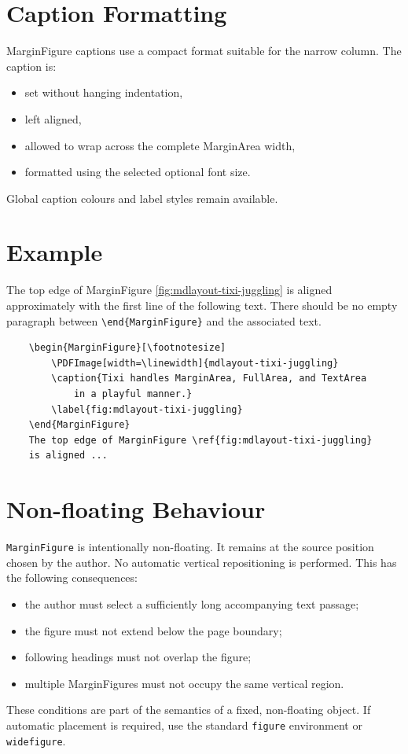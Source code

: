 \documentclass[
11pt,
a4paper,
oneside
]{scrbook}
\begin{document}
\section{Caption Formatting}
 
MarginFigure captions use a compact format suitable for the narrow column.
The caption is:
\begin{itemize}
	\item set without hanging indentation,
	\item left aligned,
	\item allowed to wrap across the complete MarginArea width,
	\item formatted using the selected optional font size.
\end{itemize}
Global caption colours and label styles remain available.
 
\section{Example}

\begin{MarginFigure}[\footnotesize]
	\caption{Tixi handles MarginArea, FullArea, and TextArea
		in a playful manner.}
	\label{fig:mdlayout-tixi-juggling}
\end{MarginFigure}
The top edge of MarginFigure \ref{fig:mdlayout-tixi-juggling} 
is aligned approximately with the first line of the following text.
There should be no empty paragraph between \verb|\end{MarginFigure}| and the
associated text.
\begin{verbatim}
	\begin{MarginFigure}[\footnotesize]
		\PDFImage[width=\linewidth]{mdlayout-tixi-juggling}
		\caption{Tixi handles MarginArea, FullArea, and TextArea
			in a playful manner.}
		\label{fig:mdlayout-tixi-juggling}
	\end{MarginFigure}
	The top edge of MarginFigure \ref{fig:mdlayout-tixi-juggling}
	is aligned ...
\end{verbatim}

	
\section{Non-floating Behaviour}
	
\texttt{MarginFigure} is intentionally non-floating.
It remains at the source position chosen by the author.
No automatic vertical repositioning is performed.
This has the following consequences:
\begin{itemize}
	\item the author must select a sufficiently long accompanying text passage;
	\item the figure must not extend below the page boundary;
	\item following headings must not overlap the figure;
	\item multiple MarginFigures must not occupy the same vertical region.
\end{itemize}
These conditions are part of the semantics of a fixed, non-floating object.
If automatic placement is required, use the standard \texttt{figure}
environment or \texttt{widefigure}.
	
\end{document}
